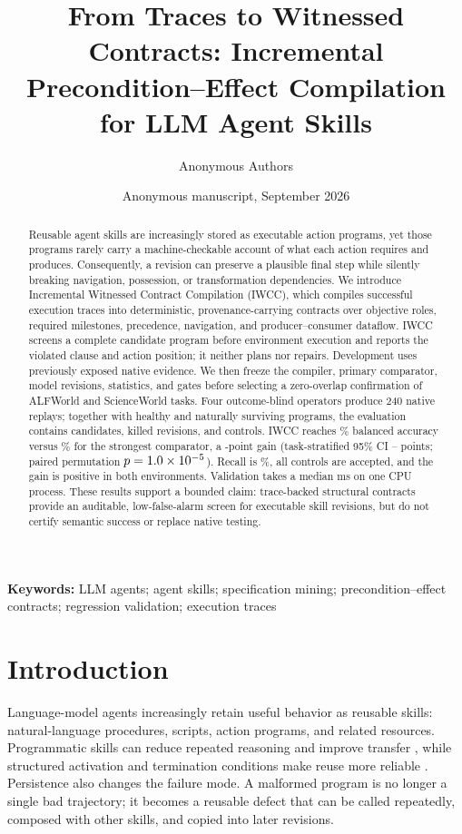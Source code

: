 \documentclass[10pt]{article}
\title{From Traces to Witnessed Contracts: Incremental Precondition--Effect Compilation for LLM Agent Skills}
\author{Anonymous Authors}
\date{Anonymous manuscript, September 2026}
\begin{document}
\maketitle

\begin{abstract}
Reusable agent skills are increasingly stored as executable action programs, yet those programs rarely carry a machine-checkable account of what each action requires and produces. Consequently, a revision can preserve a plausible final step while silently breaking navigation, possession, or transformation dependencies. We introduce Incremental Witnessed Contract Compilation (IWCC), which compiles successful execution traces into deterministic, provenance-carrying contracts over objective roles, required milestones, precedence, navigation, and producer--consumer dataflow. IWCC screens a complete candidate program before environment execution and reports the violated clause and action position; it neither plans nor repairs. Development uses previously exposed native evidence. We then freeze the compiler, primary comparator, model revisions, statistics, and gates before selecting a zero-overlap confirmation of \TaskCount{} ALFWorld and ScienceWorld tasks. Four outcome-blind operators produce 240 native replays; together with healthy and naturally surviving programs, the evaluation contains \CandidateCount{} candidates, \KilledCount{} killed revisions, and \ControlCount{} controls. IWCC reaches \IWCCBA\% balanced accuracy versus \EndpointBA\% for the strongest comparator, a \GainPoints-point gain (task-stratified 95\% CI \GainCILow--\GainCIHigh{} points; paired permutation $p=1.0\times10^{-5}$). Recall is \IWCCRecall\%, all \ControlCount{} controls are accepted, and the gain is positive in both environments. Validation takes a median \MedianRuntime{} ms on one CPU process. These results support a bounded claim: trace-backed structural contracts provide an auditable, low-false-alarm screen for executable skill revisions, but do not certify semantic success or replace native testing.
\end{abstract}

\noindent\textbf{Keywords:} LLM agents; agent skills; specification mining; precondition--effect contracts; regression validation; execution traces

\section{Introduction}
Language-model agents increasingly retain useful behavior as reusable skills: natural-language procedures, scripts, action programs, and related resources. Programmatic skills can reduce repeated reasoning and improve transfer \citep{wang2025asi,guo2026skilldisco}, while structured activation and termination conditions make reuse more reliable \citep{mi2026skillpro}. Persistence also changes the failure mode. A malformed program is no longer a single bad trajectory; it becomes a reusable defect that can be called repeatedly, composed with other skills, and copied into later revisions.
\end{document}
